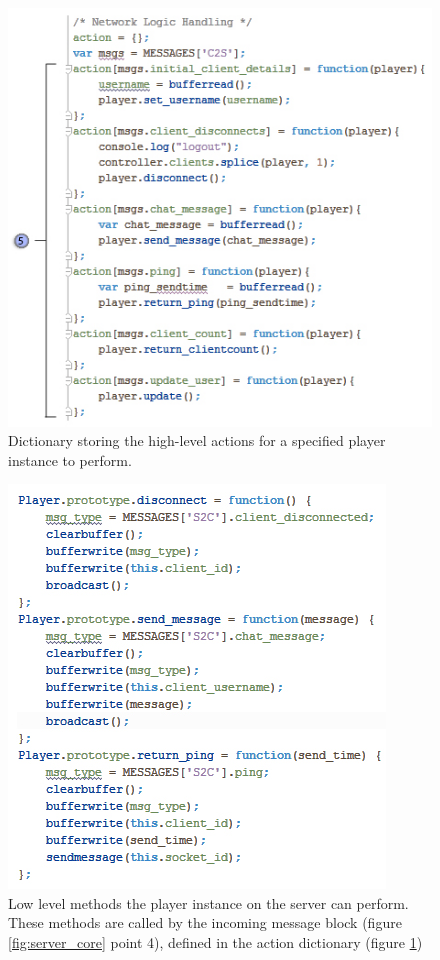 \documentclass[bsc,frontabs,twoside,singlespacing,parskip,deptreport]{infthesis}     %
\begin{document}
\begin{figure}[H]
\includegraphics[scale=0.60]{images/server_actions.jpg}
\caption{Dictionary storing the high-level actions for a specified player instance to perform.}
\label{fig:server_actions}
\vspace{1em}
\end{figure}

\begin{figure}[H]
\includegraphics[scale=0.60]{images/server_player_functions.jpg}
\caption{Low level methods the player instance on the server can perform. These methods are called by the incoming message block (figure \ref{fig:server_core} point 4), defined in the action dictionary (figure \ref{fig:server_actions})}
\label{fig:server_player_functions}
\vspace{1em}
\end{figure}
\end{document}
